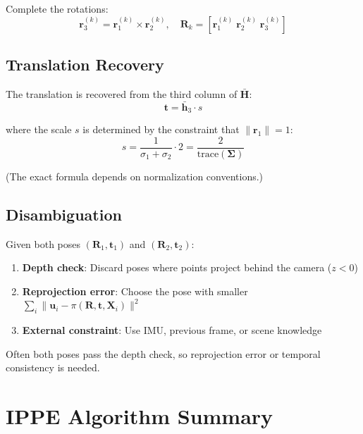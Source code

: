\documentclass[11pt]{article}
\newcommand{\vect}[1]{\mathbf{#1}}
\newcommand{\mat}[1]{\mathbf{#1}}
\begin{document}
Complete the rotations:
\[
\vect{r}_3^{(k)} = \vect{r}_1^{(k)} \times \vect{r}_2^{(k)}, \quad \mat{R}_k = [\vect{r}_1^{(k)} \; \vect{r}_2^{(k)} \; \vect{r}_3^{(k)}]
\]

\subsection{Translation Recovery}

The translation is recovered from the third column of $\bar{\mat{H}}$:
\[
\vect{t} = \bar{\vect{h}}_3 \cdot s
\]

where the scale $s$ is determined by the constraint that $\|\vect{r}_1\| = 1$:
\[
s = \frac{1}{\sigma_1 + \sigma_2} \cdot 2 = \frac{2}{\text{trace}(\mat{\Sigma})}
\]

(The exact formula depends on normalization conventions.)

\subsection{Disambiguation}

Given both poses $(\mat{R}_1, \vect{t}_1)$ and $(\mat{R}_2, \vect{t}_2)$:

\begin{enumerate}
    \item \textbf{Depth check}: Discard poses where points project behind the camera ($z < 0$)
    \item \textbf{Reprojection error}: Choose the pose with smaller $\sum_i \|\vect{u}_i - \pi(\mat{R}, \vect{t}, \vect{X}_i)\|^2$
    \item \textbf{External constraint}: Use IMU, previous frame, or scene knowledge
\end{enumerate}

Often both poses pass the depth check, so reprojection error or temporal consistency is needed.

\section{IPPE Algorithm Summary}
\end{document}
